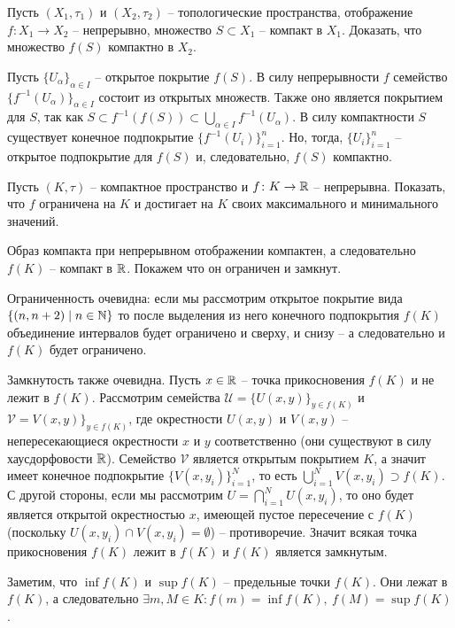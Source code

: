 \begin{task}[T3]
    Пусть $(X_1, \tau_1)$ и $(X_2, \tau_2)$ -- топологические пространства, отображение $f\colon X_1 \to X_2$ -- непрерывно, множество $S \subset X_1$ -- компакт в $X_1$. Доказать, что множество $f(S)$ компактно в $X_2$.
\end{task}
\begin{solve}
    Пусть $\{U_\alpha\}_{\alpha \in I}$ -- открытое покрытие $f(S)$. В силу непрерывности $f$ семейство $\{f^{-1}(U_\alpha)\}_{\alpha \in I}$ состоит из открытых множеств. Также оно является покрытием для $S$, так как $S \subset f^{-1}(f(S)) \subset \bigcup_{\alpha \in I} f^{-1}(U_\alpha)$. В силу компактности $S$ существует конечное подпокрытие $\{f^{-1}(U_i)\}_{i = 1}^n$. Но, тогда, $\{U_i\}_{i =1}^n$ -- открытое подпокрытие для $f(S)$ и, следовательно, $f(S)$ компактно.
\end{solve}
\begin{task}[T4]
    Пусть $(K, \tau)$ -- компактное пространство и $f\colon K \to \mathbb{R}$ -- непрерывна. Показать, что $f$ ограничена на $K$ и достигает на $K$ своих максимального и минимального значений.
\end{task}
\begin{solve}
    Образ компакта при непрерывном отображении компактен, а следовательно $f(K)$ -- компакт в $\mathbb{R}$. Покажем что он ограничен и замкнут.

    Ограниченность очевидна: если мы рассмотрим открытое покрытие вида $\{(n, n + 2) \mid n \in \mathbb{N}\}$ то после выделения из него конечного подпокрытия $f(K)$ объединение интервалов будет ограничено и сверху, и снизу -- а следовательно и $f(K)$ будет ограничено.

    Замкнутость также очевидна. Пусть $x \in \mathbb{R}$ -- точка прикосновения $f(K)$ и не лежит в $f(K)$. Рассмотрим семейства $\mathcal{U} = \{U(x, y)\}_{y \in f(K)}$ и $\mathcal{V} = V(x, y)\}_{y \in f(K)}$, где окрестности $U(x, y)$ и $V(x,y)$ -- непересекающиеся окрестности $x$ и $y$ соответственно (они существуют в силу хаусдорфовости $\mathbb{R}$). Семейство $\mathcal{V}$ является открытым покрытием $K$, а значит имеет конечное подпокрытие $\{V(x, y_i)\}_{i = 1}^N$, то есть $\bigcup_{i = 1}^{N} V(x, y_i) \supset f(K)$. С другой стороны, если мы рассмотрим $U = \bigcap_{i = 1}^{N} U(x, y_i)$, то оно будет является открытой окрестностью $x$, имеющей пустое пересечение с $f(K)$ (поскольку $U(x, y_i) \cap V(x, y_i) = \emptyset$) -- противоречие. Значит всякая точка прикосновения $f(K)$ лежит в $f(K)$ и $f(K)$ является замкнутым.

    Заметим, что $\inf f(K)$ и $\sup f(K)$ -- предельные точки $f(K)$. Они лежат в $f(K)$, а следовательно $\exists m, M \in K\colon f(m) = \inf f(K), \ f(M) = \sup f(K)$.
\end{solve}
